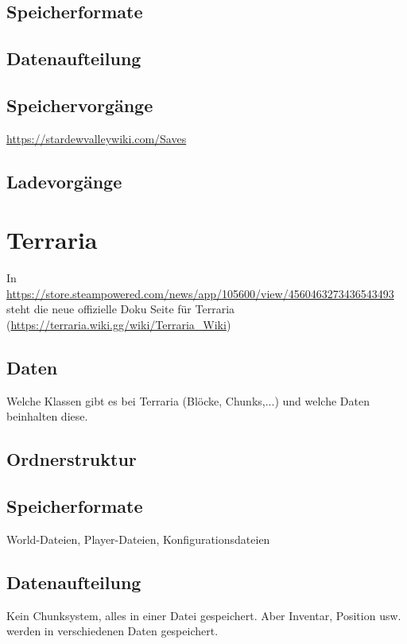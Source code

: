\subsection{Speicherformate}

\subsection{Datenaufteilung}

\subsection{Speichervorgänge}
\url{https://stardewvalleywiki.com/Saves}\\

\subsection{Ladevorgänge}



\iffalse
\section{Terraria}

In \url{https://store.steampowered.com/news/app/105600/view/4560463273436543493} steht die neue offizielle Doku Seite für Terraria (\url{https://terraria.wiki.gg/wiki/Terraria_Wiki})


\subsection{Daten}
Welche Klassen gibt es bei Terraria (Blöcke, Chunks,...) und welche Daten 
beinhalten diese.

\subsection{Ordnerstruktur}

\subsection{Speicherformate}
World-Dateien, Player-Dateien, Konfigurationsdateien 

\subsection{Datenaufteilung}
Kein Chunksystem, alles in einer Datei gespeichert. Aber Inventar, Position
usw. werden in verschiedenen Daten gespeichert.

